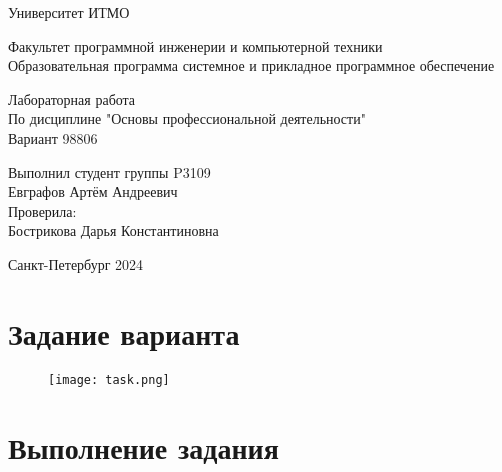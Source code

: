 

\thispagestyle{empty}
\begin{center}
\LARGE{Университет ИТМО} 
\vspace{20pt}

\LARGE{Факультет программной инженерии и компьютерной техники \\
Образовательная программа системное и прикладное программное обеспечение}
\vspace{160pt}

\LARGE{Лабораторная работа   \\
По дисциплине "Основы профессиональной деятельности" \\ 
Вариант 98806}
\vspace{120pt}
\end{center}

\begin{flushright}
\LARGE{Выполнил студент группы P3109 \\ 
Евграфов Артём Андреевич \\
Проверила: \\
Бострикова Дарья Константиновна}
\vspace{120pt}
\end{flushright}

\begin{center}
\Large{Санкт-Петербург 2024}
\end{center}

\newpage
\setcounter{page}{1}
\tableofcontents
\newpage
\section{Задание варианта}
\begin{figure}[H]
    \centering
    \texttt{[image: task.png]}
\end{figure}
\section{Выполнение задания}
